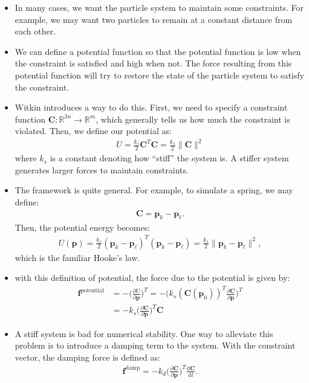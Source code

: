 \documentclass[10pt]{article}
\newcommand{\dee}{\mathrm{d}}
\newcommand{\ve}[1]{\mathbf{#1}}
\newcommand{\ra}{\rightarrow}
\newcommand{\Real}{\mathbb{R}}
\begin{document}
  \begin{itemize}
    \item In many cases, we want the particle system to maintain some constraints. For example, we may want two particles to remain at a constant distance from each other.

    \item We can define a potential function so that the potential function is low when the constraint is satisfied and high when not. The force resulting from this potential function will try to restore the state of the particle system to satisfy the constraint.

    \item Witkin introduces a way to do this. First, we need to specify a constraint function $\ve{C}: \Real^{3n} \ra \Real^{m}$, which generally tells us how much the constraint is violated. Then, we define our potential as:
    \begin{align*}
      U = \frac{k_s}{2} \ve{C}^T\ve{C} = \frac{k_s}{2}\| \ve{C} \|^2
    \end{align*}
    where $k_s$ is a constant denoting how ``stiff'' the system is. A stiffer system generates larger forces to maintain constraints.

    \item The framework is quite general. For example, to simulate a spring, we may define:
    \begin{align*}
      \ve{C} = \ve{p}_k - \ve{p}_\ell.
    \end{align*}
    Then, the potential energy becomes:
    \begin{align*}
      U(\ve{p}) = \frac{k_s}{2} (\ve{p}_k - \ve{p}_\ell)^T (\ve{p}_k - \ve{p}_\ell) = \frac{k_s}{2} \| \ve{p}_k - \ve{p}_\ell \|^2,
    \end{align*}
    which is the familiar Hooke's law.    

    \item with this definition of potential, the force due to the potential is given by:
    \begin{align*}
      \ve{f}^{\mathrm{potential}}
      &= -\bigg( \frac{\partial U}{\partial \ve{p}} \bigg)^T 
      = -\bigg( k_s (\ve{C}(\ve{p}_0))^T \frac{\partial \ve{C}}{\partial \ve{p}} \bigg)^T\\
      &= -k_s \bigg( \frac{\partial \ve{C}}{\partial \ve{p}} \bigg)^T \ve{C}
    \end{align*}

    \item A stiff system is bad for numerical stability. One way to alleviate this problem is to introduce a damping term to the system.
    With the constraint vector, the damping force is defined as:
    \begin{align*}
      \ve{f}^{\mathrm{damp}} = - k_d \bigg( \frac{\partial \ve{C}}{\partial \ve{p}} \bigg)^T \frac{\dee \ve{C}}{\dee t}.
    \end{align*}
    

\end{itemize}
\end{document}
